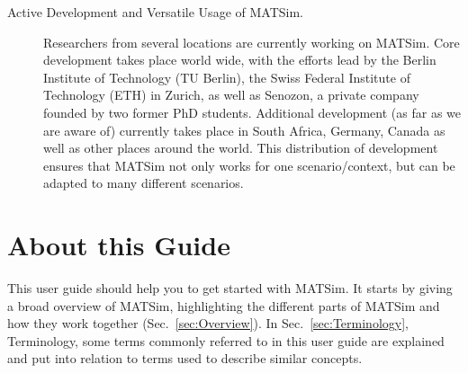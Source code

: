 \begin{description}
\item[Active Development and Versatile Usage of MATSim.]
Researchers from several locations are currently working on MATSim. Core
development takes place world wide, with the efforts lead by the Berlin
Institute of Technology (TU Berlin), the Swiss Federal Institute of Technology
(ETH) in Zurich, as well as Senozon, a private company founded by two former PhD students.
Additional development (as far as we are aware of) currently takes place in
South Africa, Germany, Canada as well as other places around the world. This
distribution of development ensures that MATSim not only works for one
scenario/context, but can be adapted to many different scenarios.
\end{description}

\section{About this Guide}

This user guide should help you to get started with MATSim. 
It starts by giving a broad overview of MATSim, highlighting the different parts
of MATSim and how they work together (Sec.~\ref{sec:Overview}). In
Sec.~\ref{sec:Terminology}, Terminology, some terms commonly referred to in this
user guide are explained and put into relation to terms used to
describe similar concepts.


